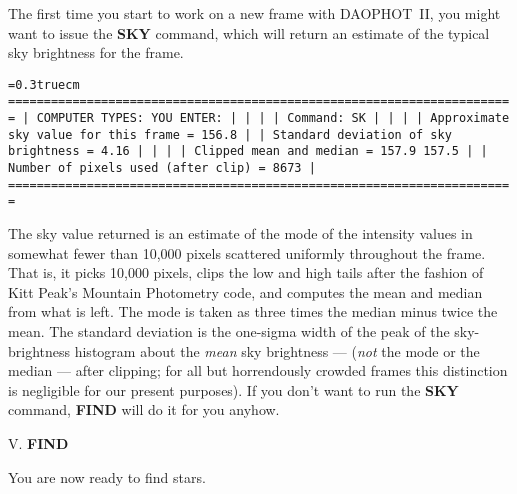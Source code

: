 The first time you start to work on a new frame with DAOPHOT~II, you
might want to issue the {\bf SKY} command, which will return an
estimate of the typical sky brightness for the frame.

\bigskip
{\noindent\obeylines\obeyspaces\frenchspacing\tt\baselineskip=0.3truecm
=======================================================================
| COMPUTER TYPES:                                      YOU ENTER:     |
|                                                                     |
| Command:                                             SK             |
|                                                                     |
|     Approximate sky value for this frame =   156.8                  |
|     Standard deviation of sky brightness =     4.16                 |
|                                                                     |
|                  Clipped mean and median =   157.9     157.5        |
|       Number of pixels used (after clip) =  8673                    |
=======================================================================
}
\bigskip

\noindent The sky value returned is an estimate of the mode of the
intensity values in somewhat fewer than 10,000 pixels scattered
uniformly throughout the frame. That is, it picks 10,000 pixels, clips
the low and high tails after the fashion of Kitt Peak's Mountain
Photometry code, and computes the mean and median from what is left.
The mode is taken as three times the median minus twice the mean.  The
standard deviation is the one-sigma width of the peak of the
sky-brightness histogram about the {\it mean\/} sky brightness ---
({\it not\/} the mode or the median --- after clipping; for all but
horrendously crowded frames this distinction is negligible for our
present purposes).  If you don't want to run the {\bf SKY} command,
{\bf FIND} will do it for you anyhow.

\vfill
\eject
\noindent V.  {\bf FIND}

You are now ready to find stars. 

